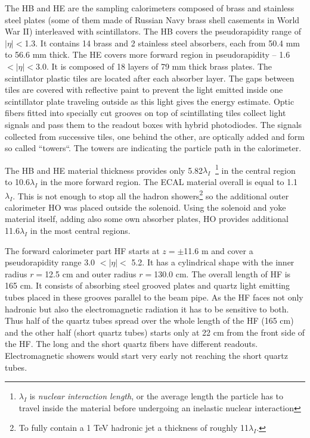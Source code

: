 The HB and HE are the sampling calorimeters composed of brass and stainless steel plates (some of them made of Russian Navy brass 
shell casements in World War II) interleaved with scintillators. The HB covers the pseudorapidity range of $|\eta| < $1.3. It contains 14 brass and
2 stainless steel absorbers, each from 50.4 mm to 56.6 mm thick. The HE covers more forward region in pseudorapidity -- 1.6$ < |\eta| < $3.0. It is composed
of 18 layers of 79 mm thick brass plates. The scintillator plastic tiles are located after each absorber layer. The gaps between tiles are covered 
with reflective paint to prevent the light emitted inside one scintillator plate traveling outside as this light gives the energy estimate. Optic fibers fitted into
specially cut grooves on top of scintillating tiles collect light signals and pass them to the readout boxes with hybrid photodiodes. The signals
collected from successive tiles, one behind the other, are optically added and form so called ``towers``. The towers are indicating 
the particle path in the calorimeter.

The HB and HE material thickness provides only 5.82$\lambda_{I}\;\;$\footnote{$\lambda_{I}$ is \textit{nuclear interaction length}, or the average 
length the particle has to travel inside the material before undergoing an inelastic nuclear interaction} in the central region to 10.6$\lambda_{I}$ in the more forward
region. The ECAL material overall is equal to 1.1$\lambda_{I}$. This is not enough to stop all the hadron showers\footnote{To fully contain a 1 TeV hadronic jet a thickness of
roughly 11$\lambda_{I}$.} so the additional outer calorimeter HO
was placed outside the solenoid. Using the solenoid and yoke material itself, adding also some own absorber plates, HO provides additional 11.6$\lambda_{I}$ in the
most central regions.

The forward calorimeter part HF starts at $z = \pm$11.6 m and cover a pseudorapidity range  3.0 $ < |\eta| < $ 5.2. It has a cylindrical shape
with the inner radius $r = $12.5 cm and outer radius $r = $130.0 cm. The overall length of HF is 165 cm. It consists of absorbing steel grooved plates and
quartz light emitting tubes placed in these grooves parallel to the beam pipe. As the HF faces not only hadronic but also the electromagnetic radiation
it has to be sensitive to both. Thus half of the quartz tubes spread over the whole length of the HF (165 cm) and the other half (short quartz tubes) starts only at 22 cm 
from the front side of the HF. The long and the short quartz fibers have different readouts. Electromagnetic showers would start very early  not reaching the 
short quartz tubes.

